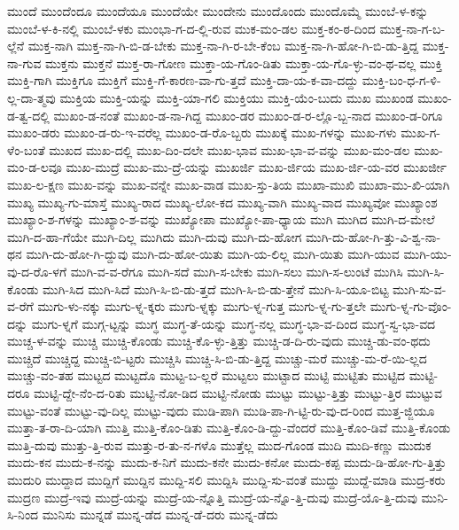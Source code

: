 {ಮುಂದೆ
ಮುಂದೆಂದೂ
ಮುಂದೆಯೂ
ಮುಂದೆಯೇ
ಮುಂದೇನು
ಮುಂದೊಂದು
ಮುಂದೊಮ್ಮೆ
ಮುಂಬೆ-ಳ-ಕನ್ನು
ಮುಂಬೆ-ಳ-ಕಿ-ನಲ್ಲಿ
ಮುಂಬೆ-ಳಕು
ಮುಂಭಾ-ಗ-ದ-ಲ್ಲಿ-ರುವ
ಮುಕ-ಮಂ-ಡಲ
ಮುಕ್ತ-ಕಂ-ಠ-ದಿಂದ
ಮುಕ್ತ-ನಾ-ಗ-ಬ-ಲ್ಲೆನೆ
ಮುಕ್ತ-ನಾಗಿ
ಮುಕ್ತ-ನಾ-ಗಿ-ಬಿ-ಡ-ಬೇಕು
ಮುಕ್ತ-ನಾ-ಗಿ-ರ-ಬೇ-ಕೆಂಬ
ಮುಕ್ತ-ನಾ-ಗಿ-ಹೋ-ಗಿ-ಬಿ-ಡು-ತ್ತಿದ್ದ
ಮುಕ್ತ-ನಾ-ಗುವ
ಮುಕ್ತನು
ಮುಕ್ತನೆ
ಮುಕ್ತ-ರಾ-ಗೋಣ
ಮುಕ್ತಾ-ಯ-ಗೊಂ-ಡಿತು
ಮುಕ್ತಾ-ಯ-ಗೊ-ಳ್ಳು-ವಂ-ಥ-ವಲ್ಲ
ಮುಕ್ತಿ
ಮುಕ್ತಿ-ಗಾಗಿ
ಮುಕ್ತಿಗೂ
ಮುಕ್ತಿಗೆ
ಮುಕ್ತಿ-ಗೆ-ಕಾರಣ-ವಾ-ಗು-ತ್ತದೆ
ಮುಕ್ತಿ-ದಾ-ಯ-ಕ-ವಾ-ದದ್ದು
ಮುಕ್ತಿ-ಬಂ-ಧ-ಗ-ಳಿ-ಲ್ಲ-ದಾ-ತ್ಮವು
ಮುಕ್ತಿಯ
ಮುಕ್ತಿ-ಯನ್ನು
ಮುಕ್ತಿ-ಯಾ-ಗಲಿ
ಮುಕ್ತಿಯು
ಮುಕ್ತಿ-ಯೆಂ-ಬುದು
ಮುಖ
ಮುಖಂಡ
ಮುಖಂ-ಡ-ತ್ವ-ದಲ್ಲಿ
ಮುಖಂ-ಡ-ನಂತೆ
ಮುಖಂ-ಡ-ನಾ-ಗಿದ್ದ
ಮುಖಂ-ಡರ
ಮುಖಂ-ಡ-ರ-ಲ್ಲೊ-ಬ್ಬ-ನಾದ
ಮುಖಂ-ಡ-ರಿಗೂ
ಮುಖಂ-ಡರು
ಮುಖಂ-ಡ-ರು-ಇ-ವರೆಲ್ಲ
ಮುಖಂ-ಡ-ರೊ-ಬ್ಬರು
ಮುಖಕ್ಕೆ
ಮುಖ-ಗಳನ್ನು
ಮುಖ-ಗಳು
ಮುಖ-ಗ-ಳೆಂ-ಬಂತೆ
ಮುಖದ
ಮುಖ-ದಲ್ಲಿ
ಮುಖ-ದಿಂ-ದಲೇ
ಮುಖ-ಭಾವ
ಮುಖ-ಭಾ-ವ-ವನ್ನು
ಮುಖ-ಮಂ-ಡಲ
ಮುಖ-ಮಂ-ಡ-ಲವೂ
ಮುಖ-ಮುದ್ರೆ
ಮುಖ-ಮು-ದ್ರೆ-ಯನ್ನು
ಮುಖರ್ಜಿ
ಮುಖ-ರ್ಜಿಯ
ಮುಖ-ರ್ಜಿ-ಯ-ವರ
ಮುಖರ್ಜೀ
ಮುಖ-ಲ-ಕ್ಷಣ
ಮುಖ-ವನ್ನು
ಮುಖ-ವನ್ನೇ
ಮುಖ-ವಾಡ
ಮುಖ-ಸ್ತು-ತಿಯ
ಮುಖಾ-ಮುಖಿ
ಮುಖಾ-ಮು-ಖಿ-ಯಾಗಿ
ಮುಖ್ಯ
ಮುಖ್ಯ-ಗು-ಮಾಸ್ತೆ
ಮುಖ್ಯ-ರಾದ
ಮುಖ್ಯ-ಲೋ-ಕದ
ಮುಖ್ಯ-ವಾಗಿ
ಮುಖ್ಯ-ವಾದ
ಮುಖ್ಯವೋ
ಮುಖ್ಯಾಂಶ
ಮುಖ್ಯಾಂ-ಶ-ಗಳನ್ನು
ಮುಖ್ಯಾಂ-ಶ-ವನ್ನು
ಮುಖ್ಯೋಪಾ
ಮುಖ್ಯೋ-ಪಾ-ಧ್ಯಾಯ
ಮುಗಿ
ಮುಗಿದ
ಮುಗಿ-ದ-ಮೇಲೆ
ಮುಗಿ-ದ-ಹಾ-ಗೆಯೇ
ಮುಗಿ-ದಿಲ್ಲ
ಮುಗಿದು
ಮುಗಿ-ದುವು
ಮುಗಿ-ದು-ಹೋಗ
ಮುಗಿ-ದು-ಹೋ-ಗಿ-ತ್ತು-ವಿ-ಶ್ವ-ನಾ-ಥನ
ಮುಗಿ-ದು-ಹೋ-ಗಿ-ದ್ದುವು
ಮುಗಿ-ದು-ಹೋ-ಯಿತು
ಮುಗಿ-ಯ-ಲಿಲ್ಲ
ಮುಗಿ-ಯಿತು
ಮುಗಿ-ಯುವ
ಮುಗಿ-ಯು-ವು-ದ-ರೊ-ಳಗೆ
ಮುಗಿ-ವ-ವ-ರೆಗೂ
ಮುಗಿ-ಸದೆ
ಮುಗಿ-ಸ-ಬೇಕು
ಮುಗಿ-ಸಲು
ಮುಗಿ-ಸ-ಲುಂಟೆ
ಮುಗಿಸಿ
ಮುಗಿ-ಸಿ-ಕೊಂಡು
ಮುಗಿ-ಸಿದ
ಮುಗಿ-ಸಿದೆ
ಮುಗಿ-ಸಿ-ಬಿ-ಡು-ತ್ತದೆ
ಮುಗಿ-ಸಿ-ಬಿ-ಡು-ತ್ತೇನೆ
ಮುಗಿ-ಸಿ-ಯೂ-ಬಿಟ್ಟ
ಮುಗಿ-ಸು-ವ-ವ-ರೆಗೆ
ಮುಗು-ಳು-ನಕ್ಕು
ಮುಗು-ಳ್ನ-ಕ್ಕರು
ಮುಗು-ಳ್ನಕ್ಕು
ಮುಗು-ಳ್ನ-ಗುತ್ತ
ಮುಗು-ಳ್ನ-ಗು-ತ್ತಲೇ
ಮುಗು-ಳ್ನ-ಗು-ವೊಂ-ದನ್ನು
ಮುಗು-ಳ್ನಗೆ
ಮುಗ್ಗ-ಟ್ಟನ್ನು
ಮುಗ್ಧ
ಮುಗ್ಧ-ತೆ-ಯನ್ನು
ಮುಗ್ಧ-ನಲ್ಲ
ಮುಗ್ಧ-ಭಾ-ವ-ದಿಂದ
ಮುಗ್ಧ-ಸ್ವ-ಭಾ-ವದ
ಮುಚ್ಚ-ಳ-ವನ್ನು
ಮುಚ್ಚಿ
ಮುಚ್ಚಿ-ಕೊಂಡು
ಮುಚ್ಚಿ-ಕೊ-ಳ್ಳು-ತ್ತಿತ್ತು
ಮುಚ್ಚಿ-ಡ-ದಿ-ರು-ವುದು
ಮುಚ್ಚಿ-ಡು-ವಂ-ಥದು
ಮುಚ್ಚಿದೆ
ಮುಚ್ಚಿದ್ದ
ಮುಚ್ಚಿ-ಬಿ-ಟ್ಟರು
ಮುಚ್ಚಿಸಿ
ಮುಚ್ಚಿ-ಸಿ-ಬಿ-ಡು-ತ್ತಿದ್ದ
ಮುಚ್ಚು-ಮರೆ
ಮುಚ್ಚು-ಮ-ರೆ-ಯಿ-ಲ್ಲದ
ಮುಚ್ಚು-ವಂ-ತಹ
ಮುಟ್ಟದ
ಮುಟ್ಟದೊ
ಮುಟ್ಟ-ಬ-ಲ್ಲರೆ
ಮುಟ್ಟಲು
ಮುಟ್ಟಾದ
ಮುಟ್ಟಿ
ಮುಟ್ಟಿತು
ಮುಟ್ಟಿದ
ಮುಟ್ಟಿ-ದರೂ
ಮುಟ್ಟಿ-ದ್ದೇ-ನೆಂ-ದ-ರಿತು
ಮುಟ್ಟಿ-ನೋ-ಡಿದ
ಮುಟ್ಟಿ-ನೋಡು
ಮುಟ್ಟು
ಮುಟ್ಟು-ತ್ತಿತ್ತು
ಮುಟ್ಟು-ತ್ತಿರ
ಮುಟ್ಟುವ
ಮುಟ್ಟು-ವಂತೆ
ಮುಟ್ಟು-ವು-ದಿಲ್ಲ
ಮುಟ್ಟು-ವುದು
ಮುಡಿ-ಪಾಗಿ
ಮುಡಿ-ಪಾ-ಗಿ-ಟ್ಟಿ-ರು-ವು-ದ-ರಿಂದ
ಮುತ್ತ-ಜ್ಜಿಯೂ
ಮುತ್ತಾ-ತ-ರಾ-ದಿ-ಯಾಗಿ
ಮುತ್ತಿ
ಮುತ್ತಿ-ಕೊಂ-ಡಿತು
ಮುತ್ತಿ-ಕೊಂ-ಡಿ-ದ್ದು-ವೆಂದರೆ
ಮುತ್ತಿ-ಕೊಂ-ಡಿವೆ
ಮುತ್ತಿ-ಕೊಂಡು
ಮುತ್ತಿ-ದುವು
ಮುತ್ತು-ತ್ತಿ-ರುವ
ಮುತ್ತು-ರ-ತು-ನ-ಗಳೊ
ಮುತ್ತೆಲ್ಲ
ಮುದ-ಗೊಂಡ
ಮುದಿ
ಮುದಿ-ಕಣ್ಣು
ಮುದುಕ
ಮುದು-ಕನ
ಮುದು-ಕ-ನನ್ನು
ಮುದು-ಕ-ನಿಗೆ
ಮುದು-ಕನೇ
ಮುದು-ಕನೋ
ಮುದು-ಕಪ್ಪ
ಮುದು-ಡಿ-ಹೋ-ಗು-ತ್ತಿತ್ತು
ಮುದುರಿ
ಮುದ್ದಾದ
ಮುದ್ದಿಗೆ
ಮುದ್ದಿನ
ಮುದ್ದಿ-ಸಲಿ
ಮುದ್ದಿಸಿ
ಮುದ್ದಿ-ಸು-ವಂತೆ
ಮುದ್ದು
ಮುದ್ದೆ-ಮಾಡಿ
ಮುದ್ರ-ಕರು
ಮುದ್ರಣ
ಮುದ್ರೆ-ಇವು
ಮುದ್ರೆ-ಯನ್ನು
ಮುದ್ರೆ-ಯ-ನ್ನೊತ್ತಿ
ಮುದ್ರೆ-ಯ-ನ್ನೊ-ತ್ತಿ-ದುವು
ಮುದ್ರೆ-ಯೊ-ತ್ತಿ-ದುವು
ಮುನಿ-ಸಿ-ನಿಂದ
ಮುನಿಸು
ಮುನ್ನಡೆ
ಮುನ್ನ-ಡೆದ
ಮುನ್ನ-ಡೆ-ದರು
ಮುನ್ನ-ಡೆದು
}
